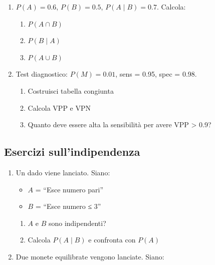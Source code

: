\documentclass[
  italian,
  letterpaper,
  a4paper,
  11pt,
  open=any]{scrbook}
\providecommand{\tightlist}{%
  \setlength{\itemsep}{0pt}\setlength{\parskip}{0pt}}
\theoremstyle{plain}
\theoremstyle{definition}
\theoremstyle{definition}
\theoremstyle{remark}
\begin{document}
\begin{tcolorbox}
\begin{enumerate}
  Calcola:

  \begin{enumerate}
  \def\labelenumii{\alph{enumii}.}
  \tightlist
  \item
    \(P(A \mid B)\)
  \item
    \(P(B \mid A)\)
  \item
    \(P(A \mid B^c)\)
  \item
    Gli eventi sono indipendenti?
  \end{enumerate}
\item
  \(P(A) = 0.6\), \(P(B) = 0.5\), \(P(A \mid B) = 0.7\). Calcola:

  \begin{enumerate}
  \def\labelenumii{\alph{enumii}.}
  \tightlist
  \item
    \(P(A \cap B)\)
  \item
    \(P(B \mid A)\)
  \item
    \(P(A \cup B)\)
  \end{enumerate}
\item
  Test diagnostico: \(P(M) = 0.01\), sens = 0.95, spec = 0.98.

  \begin{enumerate}
  \def\labelenumii{\alph{enumii}.}
  \tightlist
  \item
    Costruisci tabella congiunta
  \item
    Calcola VPP e VPN
  \item
    Quanto deve essere alta la sensibilità per avere VPP \textgreater{}
    0.9?
  \end{enumerate}
\end{enumerate}

\subsection*{Esercizi
sull'indipendenza}\label{esercizi-sullindipendenza}

\begin{enumerate}
\def\labelenumi{\arabic{enumi}.}
\setcounter{enumi}{8}
\tightlist
\item
  Un dado viene lanciato. Siano:

  \begin{itemize}
  \tightlist
  \item
    \(A\) = ``Esce numero pari''
  \item
    \(B\) = ``Esce numero ≤ 3''
  \end{itemize}

  \begin{enumerate}
  \def\labelenumii{\alph{enumii}.}
  \tightlist
  \item
    \(A\) e \(B\) sono indipendenti?
  \item
    Calcola \(P(A \mid B)\) e confronta con \(P(A)\)
  \end{enumerate}
\item
  Due monete equilibrate vengono lanciate. Siano:


\end{enumerate}
\end{tcolorbox}
\end{document}

